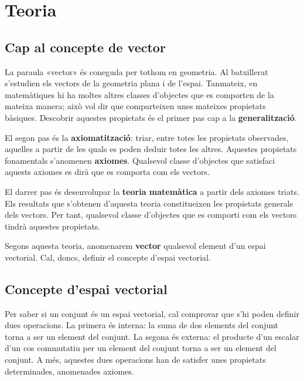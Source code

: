 
\chapter{Teoria}

\section{Cap al concepte de vector}

La paraula «vector» és coneguda per tothom en geometria. Al batxillerat s’estudien els vectors de la geometria plana i de l’espai. Tanmateix, en matemàtiques hi ha moltes altres classes d’objectes que es comporten de la mateixa manera; això vol dir que comparteixen unes mateixes propietats bàsiques. Descobrir aquestes propietats és el primer pas cap a la \textbf{generalització}.

El segon pas és la \textbf{axiomatització}: triar, entre totes les propietats observades, aquelles a partir de les quals es poden deduir totes les altres. Aquestes propietats fonamentals s’anomenen \textbf{axiomes}. Qualsevol classe d’objectes que satisfaci aquests axiomes es dirà que es comporta com els vectors.

El darrer pas és desenvolupar la \textbf{teoria matemàtica} a partir dels axiomes triats. Els resultats que s’obtenen d’aquesta teoria constitueixen les propietats generals dels vectors. Per tant, qualsevol classe d’objectes que es comporti com els vectors tindrà aquestes propietats.

Segons aquesta teoria, anomenarem \textbf{vector} qualsevol element d’un espai vectorial. Cal, doncs, definir el concepte d’espai vectorial.

\section{Concepte d’espai vectorial}

Per saber si un conjunt és un espai vectorial, cal comprovar que s’hi poden definir dues operacions. La primera és interna: la suma de dos elements del conjunt torna a ser un element del conjunt. La segona és externa: el producte d’un escalar d’un cos commutatiu per un element del conjunt torna a ser un element del conjunt. A més, aquestes dues operacions han de satisfer unes propietats determinades, anomenades axiomes.

